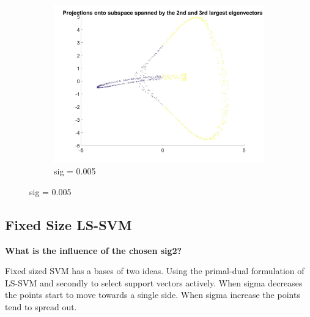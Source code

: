 \documentclass[11pt,oneside,a4paper]{article}
\begin{document}
\begin{figure}[H]
\begin{subfigure}[b]{0.4\textwidth}
		\includegraphics[width=\textwidth]{../Figures/sig005s}
		\caption{sig = 0.005}
	\end{subfigure}
\end{figure}

\subsection{Fixed Size LS-SVM}

\textbf{ What is the influence of the chosen sig2?}

Fixed sized SVM has a bases of two ideas. Using the primal-dual formulation of LS-SVM and secondly to select support vectors actively. When sigma decreases the points start to move towards a single side. When sigma increase the points tend to spread out.
\end{document}
